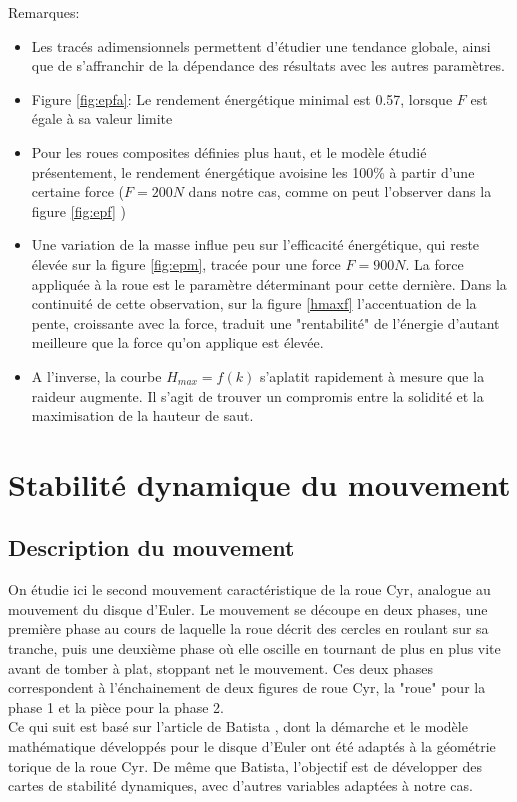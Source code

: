 Remarques:
\begin{itemize}
\item Les tracés adimensionnels permettent d'étudier une tendance globale, ainsi que de s'affranchir de la dépendance des résultats avec les autres paramètres.
\item Figure \ref{fig:epfa}: Le rendement énergétique minimal est 0.57, lorsque $F$ est égale à sa valeur limite
\item Pour les roues composites définies plus haut, et le modèle étudié présentement, le rendement énergétique avoisine les 100\% à partir d'une certaine force ($F=200 N$ dans notre cas, comme on peut l'observer dans la figure \ref{fig:epf} )
\item Une variation de la masse influe peu sur l'efficacité énergétique, qui reste élevée sur la figure \ref{fig:epm}, tracée pour une force $F=900 N$. La force appliquée à la roue est le paramètre déterminant pour cette dernière. Dans la continuité de cette observation, sur la figure \ref{hmaxf} l'accentuation de la pente, croissante avec la force, traduit une "rentabilité" de l'énergie d'autant meilleure que la force qu'on applique est élevée.
\item A l'inverse, la courbe $H_{max}=f(k)$ s'aplatit rapidement à mesure que la raideur augmente. Il s'agit de trouver un compromis entre la solidité et la maximisation de la hauteur de saut.
\end{itemize}


\section{Stabilité dynamique du mouvement}
\subsection{Description du mouvement}
On étudie ici le second mouvement caractéristique de la roue Cyr, analogue au mouvement du disque d'Euler. Le mouvement se découpe en deux phases, une première phase au cours de laquelle la roue décrit des cercles en roulant sur sa tranche, puis une deuxième phase où elle oscille en tournant de plus en plus vite avant de tomber à plat, stoppant net le mouvement. Ces deux phases correspondent à l'énchainement de deux figures de roue Cyr, la "roue" pour la phase 1 et la pièce pour la phase 2. \\
Ce qui suit est basé sur l'article de Batista \cite{Batista}, dont la démarche et le modèle mathématique développés pour le disque d'Euler ont été adaptés à la géométrie torique de la roue Cyr. De même que Batista, l'objectif est de développer des cartes de stabilité dynamiques, avec d'autres variables adaptées à notre cas.

